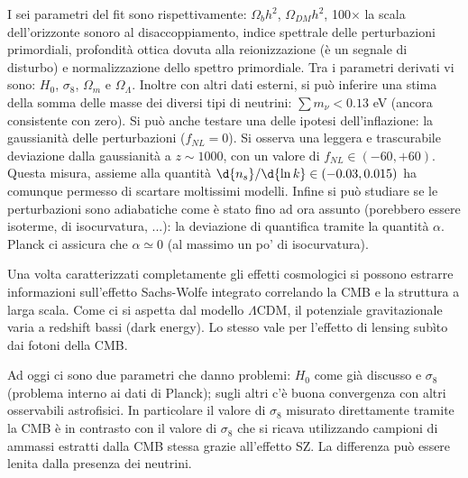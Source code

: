 I sei parametri del fit sono rispettivamente: $\Omega_b h^2$, $\Omega_{DM} h^2$, 100$\times$ la scala dell'orizzonte sonoro al disaccoppiamento, indice spettrale delle perturbazioni primordiali, profondità ottica dovuta alla reionizzazione (è un segnale di disturbo) e normalizzazione dello spettro primordiale. Tra i parametri derivati vi sono: $H_0$, $\sigma_8$, $\Omega_m$ e $\Omega_\Lambda$. Inoltre con altri dati esterni, si può inferire una stima della somma delle masse dei diversi tipi di neutrini: $\sum m_\nu <0.13$ eV (ancora consistente con zero). Si può anche testare una delle ipotesi dell'inflazione: la gaussianità delle perturbazioni ($f_{NL}=0$). Si osserva una leggera e trascurabile deviazione dalla gaussianità a $z\sim 1000$, con un valore di $f_{NL}\in(-60,+60)$. Questa misura, assieme alla quantità $\d{n_s}/\d{\ln k}\in (-0.03, 0.015)$ ha comunque permesso di scartare moltissimi modelli. Infine si può studiare se le perturbazioni sono adiabatiche come è stato fino ad ora assunto (porebbero essere isoterme, di isocurvatura, ...): la deviazione di quantifica tramite la quantità $\alpha$. Planck ci assicura che $\alpha \simeq 0$ (al massimo un po' di isocurvatura). 

Una volta caratterizzati completamente gli effetti cosmologici si possono estrarre informazioni sull'effetto Sachs-Wolfe integrato correlando la CMB e la struttura a larga scala. Come ci si aspetta dal modello $\Lambda$CDM, il potenziale gravitazionale varia a redshift bassi (dark energy). Lo stesso vale per l'effetto di lensing subìto dai fotoni della CMB. 

Ad oggi ci sono due parametri che danno problemi: $H_0$ come già discusso e $\sigma_8$ (problema interno ai dati di Planck); sugli altri c'è buona convergenza con altri osservabili astrofisici. In particolare il valore di $\sigma_8$ misurato direttamente tramite la CMB è in contrasto con il valore di $\sigma_8$ che si ricava utilizzando campioni di ammassi estratti dalla CMB stessa grazie all'effetto SZ. La differenza può essere lenita dalla presenza dei neutrini.

